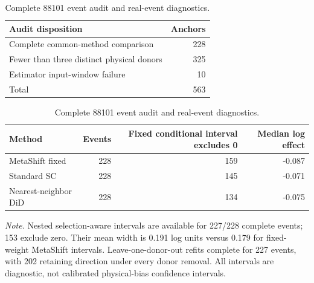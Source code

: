 \begin{table}[!ht]
\centering
\caption{Complete 88101 event audit and real-event diagnostics.}
\label{tab:real-audit}
\small
\begin{tabular}{lr}
\toprule
Audit disposition & Anchors \\
\midrule
Complete common-method comparison & 228 \\
Fewer than three distinct physical donors & 325 \\
Estimator input-window failure & 10 \\
Total & 563 \\
\bottomrule
\end{tabular}
\par\medskip
\begin{tabular}{lrrr}
\toprule
Method & Events & Fixed conditional interval excludes 0 & Median log effect \\
\midrule
MetaShift fixed & 228 & 159 & -0.087 \\
Standard SC & 228 & 145 & -0.071 \\
Nearest-neighbor DiD & 228 & 134 & -0.075 \\
\bottomrule
\end{tabular}
\par\smallskip
\begin{minipage}{0.94\linewidth}
\footnotesize\textit{Note.} Nested selection-aware intervals are available for 227/228 complete events; 153 exclude zero. Their mean width is 0.191 log units versus 0.179 for fixed-weight MetaShift intervals. Leave-one-donor-out refits complete for 227 events, with 202 retaining direction under every donor removal. All intervals are diagnostic, not calibrated physical-bias confidence intervals.
\end{minipage}
\end{table}
